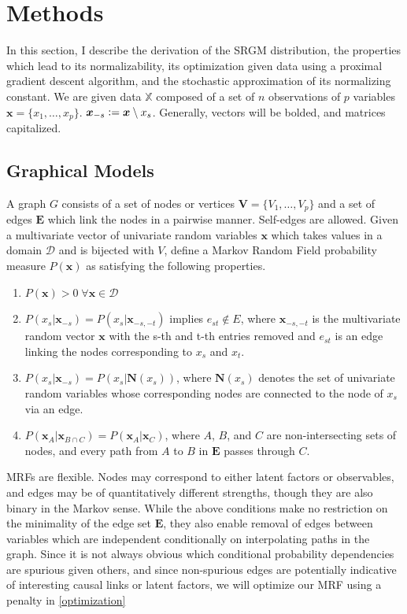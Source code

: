 \documentclass{samkoelleprelimworking}
\begin{document}
\section{Methods}

In this section, I describe the derivation of the SRGM distribution, the properties which lead to its normalizability, its optimization given data using a proximal gradient descent algorithm, and the stochastic approximation of its normalizing constant.  We are given data $\mathbb{X}$ composed of a set of $n$ observations of $p$ variables $\bm{x} = \{x_1, \dotsc , x_p\}$.  $\bm{x}_{-s} \vcentcolon = \bm{x} \setminus x_s$. Generally, vectors will be bolded, and matrices capitalized.

 \subsection{Graphical Models}
 
A graph $G$ consists of a set of nodes or vertices $\bm{V} = \{V_1, \dotsc , V_p \}$ and a set of edges $\bm{E}$ which link the nodes in a pairwise manner.  Self-edges are allowed.  Given a multivariate vector of univariate random variables $\bm{x}$ which takes values in a domain $\mathcal{D}$ and is bijected with $V$, define a Markov Random Field probability measure $P(\bm{x})$ as satisfying the following properties.
\begin{enumerate}
\item $P(\bm{x}) > 0 \; \forall \bm{x} \in \mathcal{D}$
\item $P(x_s \vert \bm{x}_{-s}) = P(x_s \vert \bm{x}_{-s,-t})$ implies $e_{st} \not\in E$, where $\bm{x}_{-s,-t}$ is the multivariate random vector $\bm{x}$ with the s-th and t-th entries removed and $e_{st}$ is an edge linking the nodes corresponding to $x_s$ and $x_t$.
\item $P(x_s \vert \bm{x}_{-s}) = P(x_s \vert \bm{N}(x_s))$, where $ \bm{N}(x_s)$ denotes the set of univariate random variables whose corresponding nodes are connected to the node of $x_s$ via an edge. 
\item $P(\bm{x}_A \vert \bm{x}_{B \cap C}) = P(\bm{x}_A \vert \bm{x}_C)$, where $A$, $B$, and $C$ are non-intersecting sets of nodes, and every path from $A$ to $B$ in $\bm{E}$ passes through $C$.
\end{enumerate}
MRFs are flexible.  Nodes may correspond to either latent factors or observables, and edges may be of quantitatively different strengths, though they are also binary in the Markov sense.  While the above conditions make no restriction on the minimality of the edge set $\bm{E}$, they also enable removal of edges between variables which are independent conditionally on interpolating paths in the graph.  Since it is not always obvious which conditional probability dependencies are spurious given others, and since non-spurious edges are potentially indicative of interesting causal links or latent factors, we will optimize our MRF using a penalty in \ref{optimization}
\end{document}
